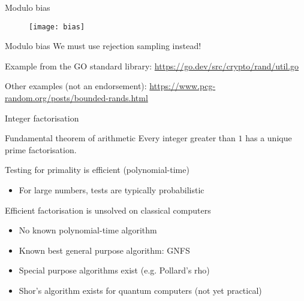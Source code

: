 \begin{frame}{Modulo bias}
  \begin{figure}
    \texttt{[image: bias]}
  \end{figure}
\end{frame}

\begin{frame}{Modulo bias}
  \pause
  We must use \alert{rejection sampling} instead!

  \vspace*{1em}

  \pause
  Example from the GO standard library:
  \url{https://go.dev/src/crypto/rand/util.go}

  \vspace*{1em}

  \pause
  Other examples (not an endorsement):
  \url{https://www.pcg-random.org/posts/bounded-rands.html}
\end{frame}

\begin{frame}{Integer factorisation}
  \pause
  \begin{block}{Fundamental theorem of arithmetic}
    Every integer greater than $1$ has a unique prime factorisation.
  \end{block}

  \pause
  Testing for primality is efficient (polynomial-time)
  \pause
  \begin{itemize}
    \item For large numbers, tests are typically probabilistic
  \end{itemize}
  
  \pause
  Efficient factorisation is unsolved on classical computers
  \begin{itemize}[<+(1)->]
    \item No known polynomial-time algorithm
    \item Known best general purpose algorithm: GNFS
    \item Special purpose algorithms exist (e.g. Pollard's rho)
    \item Shor's algorithm exists for quantum computers (not yet practical)
  \end{itemize}
\end{frame}

